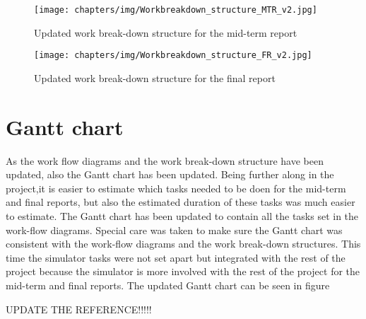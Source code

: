\begin{figure}
\texttt{[image: chapters/img/Workbreakdown\_structure\_MTR\_v2.jpg]}
\caption{Updated work break-down structure for the mid-term report}
\label{fig:WBmidterm2}
\end{figure}

\begin{figure}
\texttt{[image: chapters/img/Workbreakdown\_structure\_FR\_v2.jpg]}
\caption{Updated work break-down structure for the final report}
\label{fig:WFfinal2}
\end{figure}

\section{Gantt chart}
As the work flow diagrams and the work break-down structure have been updated, also the Gantt chart has been updated. 
Being further along in the project,it is easier to estimate which tasks needed to be doen for the mid-term and final reports, but also the estimated duration of these tasks was much easier to estimate. The Gantt chart has been updated to contain all the tasks set in the work-flow diagrams. Special care was taken to make sure the Gantt chart was consistent with the work-flow diagrams and the work break-down structures.
This time the simulator tasks were not set apart but integrated with the rest of the project because the simulator is more involved with the 
rest of the project for the mid-term and final reports.
The updated Gantt chart can be seen in figure 

UPDATE THE REFERENCE!!!!!

